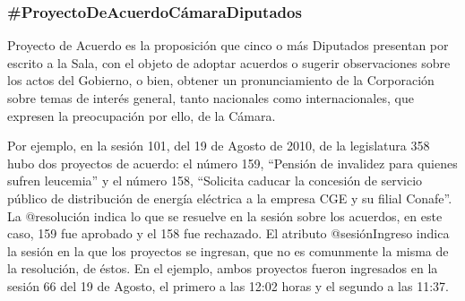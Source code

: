 \subsubsection{\#ProyectoDeAcuerdoCámaraDiputados}

Proyecto de Acuerdo es la proposición que cinco o más Diputados
presentan por escrito a la Sala, con el objeto de adoptar acuerdos o
sugerir observaciones sobre los actos del Gobierno, o bien, obtener un
pronunciamiento de la Corporación sobre temas de interés general,
tanto nacionales como internacionales, que expresen la preocupación
por ello, de la Cámara.

Por ejemplo, en la sesión 101, del 19 de Agosto de 2010, de la
legislatura 358 hubo dos proyectos de acuerdo:
el número 159, ``Pensión de invalidez para quienes sufren leucemia'' y
el número 158, ``Solicita caducar la concesión de servicio público de
distribución de energía eléctrica a la empresa CGE y su filial
Conafe''. La @resolución indica lo que se resuelve en la sesión sobre
los acuerdos, en este caso, 159 fue aprobado y el 158 fue
rechazado. El atributo @sesiónIngreso indica la sesión en la que los
proyectos se ingresan, que no es comunmente la misma de la resolución,
de éstos. En el ejemplo, ambos proyectos fueron ingresados en la
sesión 66 del 19 de Agosto, el primero a las 12:02 horas y el segundo
a las 11:37.

\begin{description}
  
\end{description}
